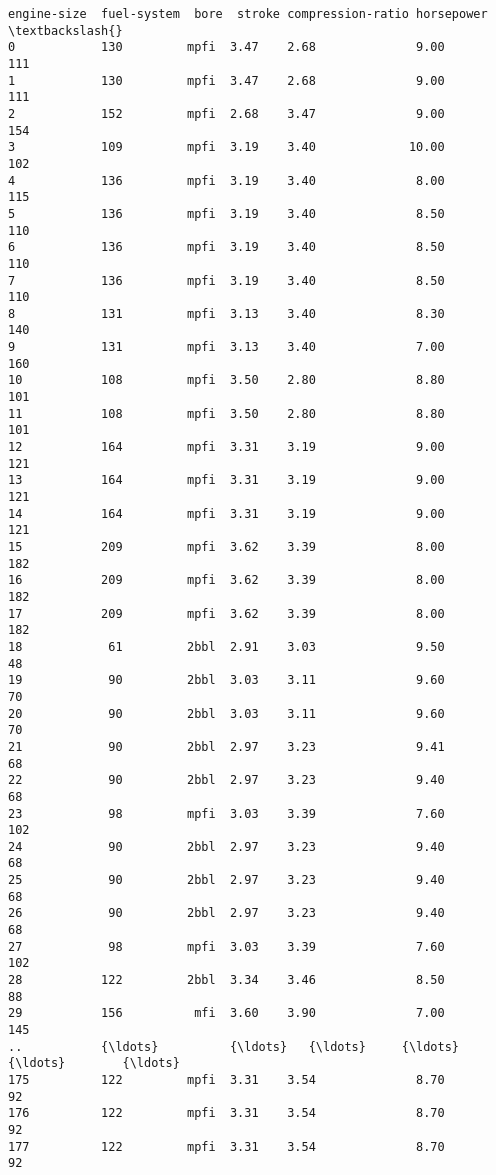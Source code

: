 \documentclass[11pt]{article}
\begin{document}
\begin{tcolorbox}[breakable, boxrule=.5pt, size=fbox, pad at break*=1mm, opacityfill=0]
\begin{Verbatim}[commandchars=\\\{\}]
     engine-size  fuel-system  bore  stroke compression-ratio horsepower  \textbackslash{}
0            130         mpfi  3.47    2.68              9.00        111
1            130         mpfi  3.47    2.68              9.00        111
2            152         mpfi  2.68    3.47              9.00        154
3            109         mpfi  3.19    3.40             10.00        102
4            136         mpfi  3.19    3.40              8.00        115
5            136         mpfi  3.19    3.40              8.50        110
6            136         mpfi  3.19    3.40              8.50        110
7            136         mpfi  3.19    3.40              8.50        110
8            131         mpfi  3.13    3.40              8.30        140
9            131         mpfi  3.13    3.40              7.00        160
10           108         mpfi  3.50    2.80              8.80        101
11           108         mpfi  3.50    2.80              8.80        101
12           164         mpfi  3.31    3.19              9.00        121
13           164         mpfi  3.31    3.19              9.00        121
14           164         mpfi  3.31    3.19              9.00        121
15           209         mpfi  3.62    3.39              8.00        182
16           209         mpfi  3.62    3.39              8.00        182
17           209         mpfi  3.62    3.39              8.00        182
18            61         2bbl  2.91    3.03              9.50         48
19            90         2bbl  3.03    3.11              9.60         70
20            90         2bbl  3.03    3.11              9.60         70
21            90         2bbl  2.97    3.23              9.41         68
22            90         2bbl  2.97    3.23              9.40         68
23            98         mpfi  3.03    3.39              7.60        102
24            90         2bbl  2.97    3.23              9.40         68
25            90         2bbl  2.97    3.23              9.40         68
26            90         2bbl  2.97    3.23              9.40         68
27            98         mpfi  3.03    3.39              7.60        102
28           122         2bbl  3.34    3.46              8.50         88
29           156          mfi  3.60    3.90              7.00        145
..           {\ldots}          {\ldots}   {\ldots}     {\ldots}               {\ldots}        {\ldots}
175          122         mpfi  3.31    3.54              8.70         92
176          122         mpfi  3.31    3.54              8.70         92
177          122         mpfi  3.31    3.54              8.70         92

\end{Verbatim}
\end{tcolorbox}
\end{document}
